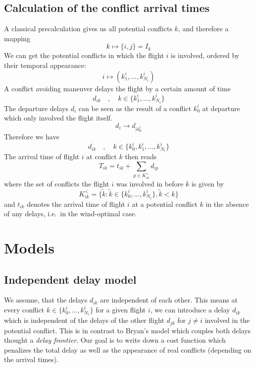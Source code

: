 \documentclass{article}
\begin{document}
\subsection{Calculation of the conflict arrival times}
A classical precalculation gives us all potential conflicts $k$, and therefore a mapping
\begin{equation*}
    k \mapsto \{i, j\} = I_k
\end{equation*}
We can get the potential conflicts in which the flight $i$ is involved, ordered by their temporal appearance:
\begin{equation*}
    i \mapsto (k^i_1, \dots, k^i_{N_i})
\end{equation*}
A conflict avoiding maneuver delays the flight by a certain amount of time
\begin{equation*}
    d_{ik} \quad, \quad  k\in\{k^i_1, \dots, k^i_{N_i}\}
\end{equation*}
The departure delays $d_i$ can be seen as the result of a conflict $k^i_0$ at departure which only involved the flight itself.
\begin{equation*}
    d_i \to d_{ik^i_0}
\end{equation*}
Therefore we have
\begin{equation*}
    d_{ik} \quad, \quad  k\in\{k^i_0, k^i_1, \dots, k^i_{N_i}\}
\end{equation*}
The arrival time of flight $i$ at conflict $k$ then reads
\begin{equation*}
    T_{ik} = t_{ik} + \sum_{p \in K^<_{ik}} d_{ip}
\end{equation*}
where the set of conflicts the flight $i$ was involved in before $k$ is given by
\begin{equation*}
    K^<_{ik} = \{\tilde k : \tilde k \in\{k^i_0, \dots, k^i_{N_i}\}, \tilde k < k\}
\end{equation*}
and $t_{ik}$ denotes the arrival time of flight $i$ at a potential conflict $k$ in the absence of any delays, i.e.\ in the wind-optimal case.

\section{Models}
\subsection{Independent delay model}
We assume, that the delays $d_{ik}$ are independent of each other. 
This means at every conflict $k \in  \{k^i_0, \dots, k^i_{N_i}\}$ for a given flight $i$, we can introduce a delay $d_{ik}$ which is independent of the delays of the other flight $d_{jk}$ for $j\neq i$ involved in the potential conflict.
This is in contrast to Bryan's model which couples both delays thought a \textit{delay frontier}.
Our goal is to write down a cost function which penalizes the total delay as well as the appearance of real conflicts (depending on the arrival times).
\end{document}

